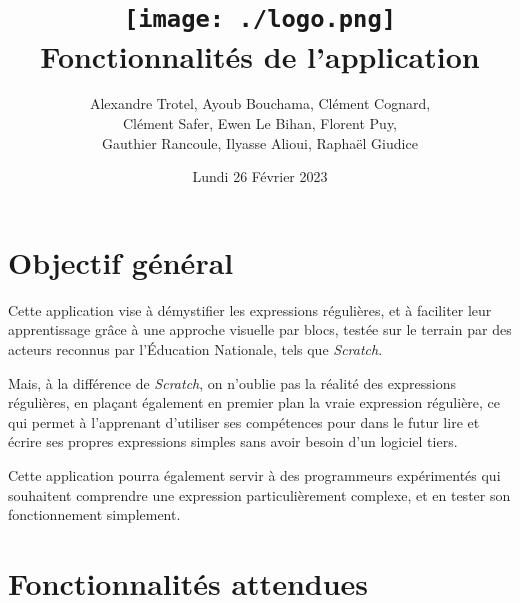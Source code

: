 \documentclass{article}
\begin{document}
    \title{
        \texttt{[image: ./logo.png]} \\[2cm]
        Fonctionnalités de l'application
    }
    \author{Alexandre Trotel, Ayoub Bouchama, Clément Cognard, \\Clément Safer, Ewen Le Bihan, Florent Puy, \\Gauthier Rancoule, Ilyasse Alioui, Raphaël Giudice}
    \date{Lundi 26 Février 2023}

    \maketitle
    \newpage

    \section{Objectif général}

    Cette application vise à démystifier les expressions régulières, et à faciliter leur apprentissage grâce à une approche visuelle par blocs, testée sur le terrain par des acteurs reconnus par l'Éducation Nationale, tels que \emph{Scratch}.

    Mais, à la différence de \emph{Scratch}, on n'oublie pas la réalité des expressions régulières, en plaçant également en premier plan la vraie expression régulière, ce qui permet à l'apprenant d'utiliser ses compétences pour dans le futur lire et écrire ses propres expressions simples sans avoir besoin d'un logiciel tiers.

    Cette application pourra également servir à des programmeurs expérimentés qui souhaitent comprendre une expression particulièrement complexe, et en tester son fonctionnement simplement.

    \section{Fonctionnalités attendues}
\end{document}
